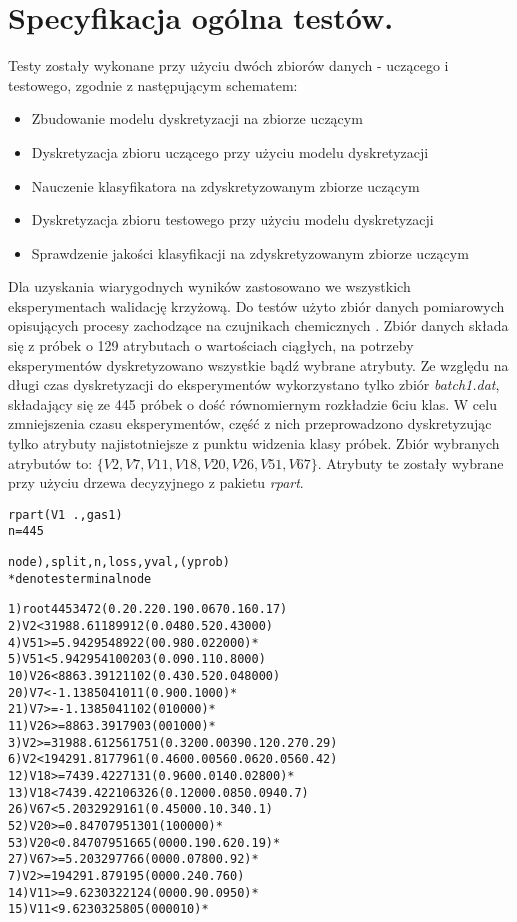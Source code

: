 \section{Specyfikacja ogólna testów.}
 Testy zostały wykonane przy użyciu dwóch zbiorów danych - uczącego i testowego, zgodnie z następującym schematem:
\begin{itemize}
	\item{Zbudowanie modelu dyskretyzacji na zbiorze uczącym}
	\item{Dyskretyzacja zbioru uczącego przy użyciu modelu dyskretyzacji}
	\item{Nauczenie klasyfikatora na zdyskretyzowanym zbiorze uczącym}
	\item{Dyskretyzacja zbioru testowego przy użyciu modelu dyskretyzacji}
	\item{Sprawdzenie jakości klasyfikacji na zdyskretyzowanym zbiorze uczącym}
\end{itemize}
Dla uzyskania wiarygodnych wyników zastosowano we wszystkich eksperymentach walidację krzyżową. Do testów użyto zbiór danych pomiarowych opisujących procesy zachodzące na czujnikach chemicznych \cite{Gas:2012}. Zbiór danych składa się z próbek o 129 atrybutach o wartościach ciągłych, na potrzeby eksperymentów dyskretyzowano wszystkie bądź wybrane atrybuty. Ze względu na długi czas dyskretyzacji do eksperymentów wykorzystano tylko zbiór \emph{batch1.dat}, składający się ze 445 próbek o dość równomiernym rozkładzie 6ciu klas. W celu zmniejszenia czasu eksperymentów, część z nich przeprowadzono dyskretyzując tylko atrybuty najistotniejsze z punktu widzenia klasy próbek. Zbiór wybranych atrybutów to: $\{V2, V7, V11, V18, V20, V26, V51, V67\}$. Atrybuty te zostały wybrane przy użyciu drzewa decyzyjnego z pakietu \emph{rpart}.

\newpage
\begin{alltt}
rpart(V1 ~ ., gas1)
n= 445 

node), split, n, loss, yval, (yprob)
      * denotes terminal node

 1) root 445 347 2 (0.2 0.22 0.19 0.067 0.16 0.17)  
   2) V2< 31988.61 189  91 2 (0.048 0.52 0.43 0 0 0)  
     4) V51>=5.942954 89   2 2 (0 0.98 0.022 0 0 0) *
     5) V51< 5.942954 100  20 3 (0.09 0.11 0.8 0 0 0)  
      10) V26< 8863.391 21  10 2 (0.43 0.52 0.048 0 0 0)  
        20) V7< -1.138504 10   1 1 (0.9 0 0.1 0 0 0) *
        21) V7>=-1.138504 11   0 2 (0 1 0 0 0 0) *
      11) V26>=8863.391 79   0 3 (0 0 1 0 0 0) *
   3) V2>=31988.61 256 175 1 (0.32 0 0.0039 0.12 0.27 0.29)  
     6) V2< 194291.8 177  96 1 (0.46 0 0.0056 0.062 0.056 0.42)  
      12) V18>=7439.422 71   3 1 (0.96 0 0.014 0.028 0 0) *
      13) V18< 7439.422 106  32 6 (0.12 0 0 0.085 0.094 0.7)  
        26) V67< 5.20329 29  16 1 (0.45 0 0 0.1 0.34 0.1)  
          52) V20>=0.8470795 13   0 1 (1 0 0 0 0 0) *
          53) V20< 0.8470795 16   6 5 (0 0 0 0.19 0.62 0.19) *
        27) V67>=5.20329 77   6 6 (0 0 0 0.078 0 0.92) *
     7) V2>=194291.8 79  19 5 (0 0 0 0.24 0.76 0)  
      14) V11>=9.623032 21   2 4 (0 0 0 0.9 0.095 0) *
      15) V11< 9.623032 58   0 5 (0 0 0 0 1 0) *
\end{alltt}



